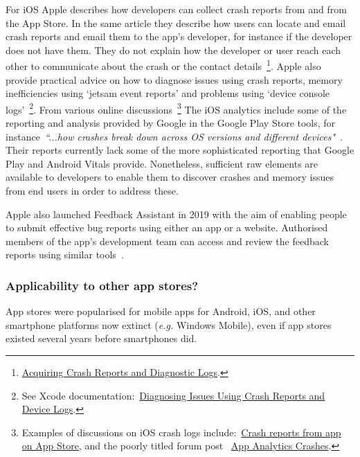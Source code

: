 For iOS Apple describes how developers can collect crash reports from  and from the App Store. In the same article they describe how users can locate and email crash reports and email them to the app's developer, for instance if the developer does not have them. They do not explain how the developer or user reach each other to communicate about the crash or the contact details~\footnote{\href{https://developer.apple.com/documentation/xcode/diagnosing_issues_using_crash_reports_and_device_logs/acquiring_crash_reports_and_diagnostic_logs}{Acquiring Crash Reports and Diagnostic Logs}.}. 
%
Apple also provide practical advice on how to diagnose issues using crash reports, memory inefficiencies using `jetsam event reports' and problems using `device console logs'~\footnote{See Xcode documentation:~\href{https://developer.apple.com/documentation/xcode/diagnosing_issues_using_crash_reports_and_device_logs}{Diagnosing Issues Using Crash Reports and Device Logs}.}. 
% 
From various online discussions~\footnote{Examples of discussions on iOS crash logs include:~\href{https://stackoverflow.com/questions/10145665/crash-reports-from-app-on-app-store}{Crash reports from app on App Store}, and the poorly titled forum post ~\href{https://developer.apple.com/forums/thread/30934}{App Analytics Crashes}.} 
The iOS analytics include some of the reporting and analysis provided by Google in the Google Play Store tools, for instance~\emph{``...how crashes break down across OS versions and different devices"}~. Their reports currently lack some of the more sophisticated reporting that Google Play and Android Vitals provide. Nonetheless, sufficient raw elements are available to developers to enable them to discover crashes and memory issues from end users in order to address these. 

Apple also launched Feedback Assistant in 2019 with the aim of enabling people to submit effective bug reports using either an app or a website. Authorised members of the app's development team can access and review the feedback reports using similar tools~.


\subsubsection{Applicability to other app stores?}
App stores were popularised for mobile apps for Android, iOS, and other smartphone platforms now extinct (\emph{e.g.} Windows Mobile), even if app stores existed several years before smartphones did. %

